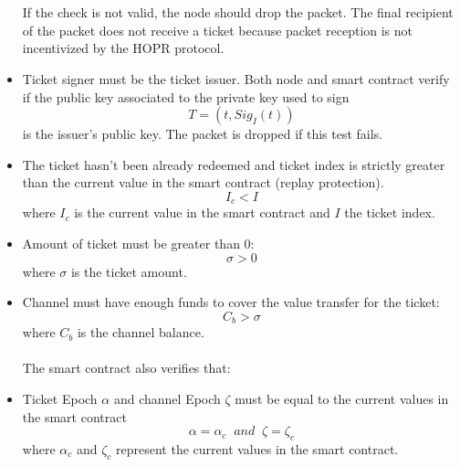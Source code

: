 \begin{itemize}
\\~\\If the check is not valid, the node should drop the packet.
The final recipient of the packet does not receive a ticket because packet reception is not incentivized by the HOPR protocol.
\item Ticket signer must be the ticket issuer. Both node and smart contract verify if the public key associated to the private key used to sign $$T= (t, Sig_I(t))$$ is the issuer's public key. The packet is dropped if this test fails.
\item The ticket hasn't been already redeemed and ticket index is strictly greater than the current value in the smart contract (replay protection).
     $$I_c <I$$ where $I_c$ is the current value in the smart contract and $I$ the ticket index.
\item Amount of ticket must be greater than 0: $$\sigma>0$$ where $\sigma$ is the ticket amount.

\item Channel must have enough funds to cover the value transfer for the ticket: $$ C_b>\sigma$$ where $C_b$ is the channel balance.
\\~\\ The smart contract also verifies that:
\item Ticket Epoch $\alpha$ and channel Epoch $\zeta$ must be equal to the current values in the smart contract $$\alpha=\alpha_c \;\; and \;\; \zeta=\zeta_c$$
where $\alpha_c$ and $\zeta_c$ represent the current values in the smart contract.



\end{itemize}
